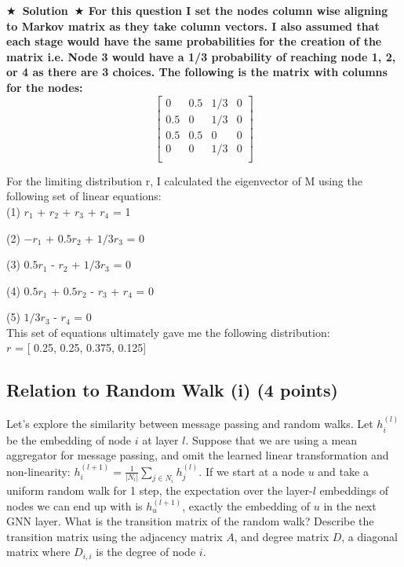 \documentclass{article}
\numberwithin{figure}{section}
\newcommand{\Solution}[1]{{\medskip \color{red} \bf $\bigstar$~\sf \textbf{Solution}~$\bigstar$ \sf #1 } \bigskip}
\begin{document}
\Solution{
For this question I set the nodes column wise aligning to Markov matrix as they take column vectors. I also assumed that each stage would have the same probabilities for the creation of the matrix i.e. Node 3 would have a 1/3 probability of reaching node 1, 2, or 4 as there are 3 choices. The following is the matrix with columns for the nodes:
\[
\begin{bmatrix}
0 & 0.5 & 1/3 & 0 \\
0.5 & 0 & 1/3 & 0 \\
0.5 & 0.5 & 0 & 0 \\
0 & 0 & 1/3 & 0 \\
\end{bmatrix}
\]

For the limiting distribution r, I calculated the eigenvector of M using the following set of linear equations:
\\

\hspace{2cm}(1) $r_1$ + $r_2$ + $r_3$ + $r_4$ = 1

\hspace{2cm}(2) $-r_1$ + $0.5r_2$ + $1/3r_3$ = 0

\hspace{2cm}(3) $0.5r_1$ - $r_2$ + $1/3r_3$ = 0

\hspace{2cm}(4) $0.5r_1$ + $0.5r_2$ - $r_3$ + $r_4$ = 0

\hspace{2cm}(5) $1/3r_3$ - $r_4$ = 0
\\

This set of equations ultimately gave me the following distribution:
\\

\hspace{2cm}$r$ = [ 0.25, 0.25, 0.375, 0.125]

}


\subsection{Relation to Random Walk (i) (4 points)}

Let’s explore the similarity between message passing and random walks. Let $h^{(l)}_i$ be the embedding of node $i$ at layer $l$. Suppose that we are using a mean aggregator for message passing, and omit the learned linear transformation and non-linearity: $h^{(l+1)}_i = \frac{1}{|N_i|} \sum_{j \in N_i} h^{(l)}_j$. If we start at a node $u$ and take a uniform random walk for 1 step, the expectation over the layer-$l$ embeddings
of nodes we can end up with is $h^{(l+1)}_u$, exactly the embedding of $u$ in the next GNN layer. What is the transition matrix of the random walk? Describe the transition matrix using the adjacency matrix $A$, and degree matrix $D$, a diagonal matrix where $D_{i,i}$ is the degree of node $i$.
\end{document}
